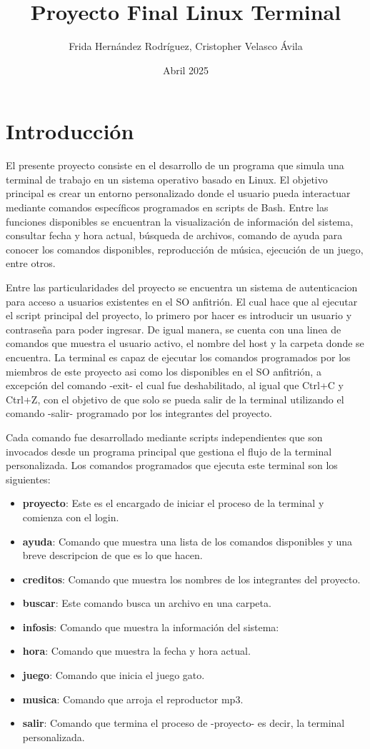 \documentclass{article}
\title{Proyecto Final Linux Terminal}
\author{Frida Hernández Rodríguez, Cristopher Velasco Ávila}
\date{Abril 2025}
\begin{document}
\maketitle
\pagebreak
\tableofcontents
\pagebreak
\section{Introducción}
El presente proyecto consiste en el desarrollo de un programa que simula una terminal de trabajo en un sistema operativo basado en Linux.  
El objetivo principal es crear un entorno personalizado donde el usuario pueda interactuar mediante comandos específicos programados en scripts de Bash.  
Entre las funciones disponibles se encuentran la visualización de información del sistema, consultar fecha y hora actual, búsqueda de archivos, comando de ayuda para conocer los comandos disponibles, reproducción de música, ejecución de un juego, entre otros.  

Entre las particularidades del proyecto se encuentra un sistema de autenticacion para acceso a usuarios existentes en el SO anfitrión. El cual hace que al ejecutar el script principal del proyecto, lo primero por hacer es introducir un usuario y contraseña para poder ingresar. De igual manera, se cuenta con una linea de comandos que muestra el usuario activo, el nombre del host y la carpeta donde se encuentra. La terminal es capaz de ejecutar los comandos programados por los miembros de este proyecto asi como los disponibles en el SO anfitrión, a excepción del comando -exit- el cual fue deshabilitado, al igual que Ctrl+C y Ctrl+Z, con el objetivo de que solo se pueda salir de la terminal utilizando el comando -salir- programado por los integrantes del proyecto.

Cada comando fue desarrollado mediante scripts independientes que son invocados desde un programa principal que gestiona el flujo de la terminal personalizada. Los comandos programados que ejecuta este terminal son los siguientes:

\begin{itemize}
    \item \textbf{proyecto}: Este es el encargado de iniciar el proceso de la terminal y comienza con el login.
    \item \textbf{ayuda}: Comando que muestra una lista de los comandos disponibles y una breve descripcion de que es lo que hacen.
    \item \textbf{creditos}: Comando que muestra los nombres de los integrantes del proyecto.
    \item \textbf{buscar}: Este comando busca un archivo en una carpeta.
    \item \textbf{infosis}: Comando que muestra la información del sistema:
    \item \textbf{hora}: Comando que muestra la fecha y hora actual.
    \item \textbf{juego}: Comando que inicia el juego gato.
    \item \textbf{musica}: Comando que arroja el reproductor mp3.
    \item \textbf{salir}: Comando que termina el proceso de -proyecto- es decir, la terminal personalizada. 
\end{itemize}
\end{document}
